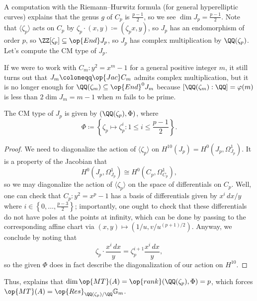 \documentclass{article}
\begin{document}
A computation with the Riemann--Hurwitz formula (for general hyperelliptic curves) explains that the genus $g$ of $C_p$ is $\frac{p-1}2$, so we see $\dim J_p=\frac{p-1}2$. Note that $\langle\zeta_p\rangle$ acts on $C_p$ by $\zeta_p\cdot(x,y)\coloneqq(\zeta_px,y)$, so $J_p$ has an endomorphism of order $p$, so $\ZZ[\zeta_p]\subseteq\op{End}J_p$, so $J_p$ has complex multiplication by $\QQ(\zeta_p)$. Let's compute the CM type of $J_p$.
\begin{remark}
	If we were to work with $C_m\colon y^2=x^m-1$ for a general positive integer $m$, it still turns out that $J_m\coloneqq\op{Jac}C_m$ admits complex multiplication, but it is no longer enough for $\QQ(\zeta_m)\subseteq\op{End}^0J_m$ because $[\QQ(\zeta_m):\QQ]=\varphi(m)$ is less than $2\dim J_m=m-1$ when $m$ fails to be prime.
\end{remark}
\begin{lemma}
	The CM type of $J_p$ is given by $(\QQ(\zeta_p),\Phi)$, where
	\[\Phi\coloneqq\left\{\zeta_p\mapsto\zeta_p^i:1\le i\le\frac{p-1}2\right\}.\]
\end{lemma}
\begin{proof}
	We need to diagonalize the action of $\langle\zeta_p\rangle$ on $H^{10}(J_p)=H^0(J_p,\Omega^1_{J_p})$. It is a property of the Jacobian that
	\[H^0(J_p,\Omega^1_{J_p})\cong H^0(C_p,\Omega^1_{C_p}),\]
	so we may diagonalize the action of $\langle\zeta_p\rangle$ on the space of differentials on $C_p$. Well, one can check that $C_p\colon y^2=x^p-1$ has a basis of differentials given by $x^i\,dx/y$ where $i\in\left\{0,\ldots,\frac{p-3}2\right\}$; importantly, one ought to check that these differentials do not have poles at the points at infinity, which can be done by passing to the corresponding affine chart via $(x,y)\mapsto\left(1/u,v/u^{(p+1)/2}\right)$. Anyway, we conclude by noting that
	\[\zeta_p\cdot\frac{x^i\,dx}y=\zeta_p^{i+1}\frac{x^i\,dx}y,\]
	so the given $\Phi$ does in fact describe the diagonalization of our action on $H^{10}$.
\end{proof}
Thus,  explains that $\dim\op{MT}(A)=\op{rank}(\QQ(\zeta_p),\Phi)=p$, which forces $\op{MT}(A)=\op{Res}_{\QQ(\zeta_p)/\QQ}\mathbb G_m$.
\end{document}
